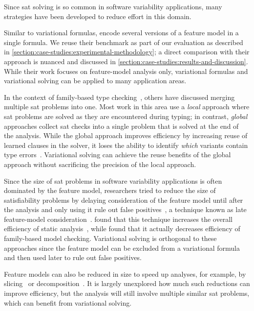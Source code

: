 \label{section:related-work:reasoning-about-variability}
%
Since \ac{sat} solving is so common in software variability applications, many
strategies have been developed to reduce effort in this domain.

Similar to variational formulas, \citet{NMS+:GPCE18} encode several versions of
a feature model in a single formula. We reuse their benchmark as part of our
evaluation as described in
\autoref{section:case-studies:experimental-methodology}; a direct comparison
with their approach is nuanced and discussed in
\autoref{section:case-studies:results-and-discussion}.
%
While their work focuses on feature-model analysis only, variational formulas
and variational solving can be applied to many application areas.

In the context of family-based type checking~\citep{TAK+:CSUR14}, others have
discussed merging multiple \ac{sat} problems into one.
%
Most work in this area use a \emph{local} approach where \ac{sat} problems are
solved as they are encountered during typing; in contrast, \emph{global}
approaches collect \ac{sat} checks into a single problem that is solved at the
end of the analysis.
%
While the global approach improves efficiency by increasing reuse of learned
clauses in the solver, it loses the ability to identify \emph{which} variants
contain type errors~\citep{ASLK:FOSD10,HZS:SCP11}.
%
Variational solving can achieve the reuse benefits of the global approach
without sacrificing the precision of the local approach.


Since the size of \ac{sat} problems in software variability applications is often
dominated by the feature model, researchers tried to reduce the size of
satisfiability problems by delaying consideration of the feature model until
after the analysis and only using it rule out false
positives~\citep{BMB+:PLDI13,CCS+13,LKA+:ESECFSE13}, a technique known as late
feature-model consideration~\citep{TAK+:CSUR14}.
%
\citet{BMB+:PLDI13} found that this technique increases the overall efficiency
of static analysis~\citep{BMB+:PLDI13}, while \citet{CCS+13} found that it
actually decreases efficiency of family-based model checking. Variational
solving is orthogonal to these approaches since the feature model can be
excluded from a variational formula and then used later to rule out false
positives.


Feature models can also be reduced in size to speed up analyses, for example,
by slicing~\citep{ACLF:ASE11,KST+:SPLC16} or decomposition~\citep{SKT+:ICSE16}.
It is largely unexplored how much such reductions can improve efficiency, but the
analysis will still involve multiple similar \ac{sat} problems, which can
benefit from variational solving.


